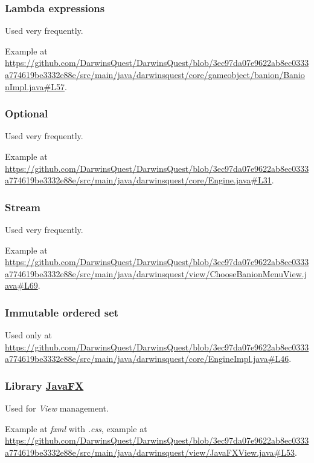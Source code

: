 \documentclass[12pt, a4paper]{report}
\theoremstyle{definition}
\begin{document}
        \subsubsection{Lambda expressions}

        Used very frequently.

        Example at \url{https://github.com/DarwinsQuest/DarwinsQuest/blob/3ec97da07e9622ab8ec0333a774619be3332e88e/src/main/java/darwinsquest/core/gameobject/banion/BanionImpl.java#L57}.

        \subsubsection{Optional}

        Used very frequently.

        Example at \url{https://github.com/DarwinsQuest/DarwinsQuest/blob/3ec97da07e9622ab8ec0333a774619be3332e88e/src/main/java/darwinsquest/core/Engine.java#L31}.

        \subsubsection{Stream}

        Used very frequently.

        Example at \url{https://github.com/DarwinsQuest/DarwinsQuest/blob/3ec97da07e9622ab8ec0333a774619be3332e88e/src/main/java/darwinsquest/view/ChooseBanionMenuView.java#L69}.

        \subsubsection{Immutable ordered set}

        Used only at \url{https://github.com/DarwinsQuest/DarwinsQuest/blob/3ec97da07e9622ab8ec0333a774619be3332e88e/src/main/java/darwinsquest/core/EngineImpl.java#L46}.

        \subsubsection{Library \href{https://openjfx.io/}{JavaFX}}
        
        Used for \emph{View} management.

        Example at \textit{fxml} with \textit{.css}, example at \url{https://github.com/DarwinsQuest/DarwinsQuest/blob/3ec97da07e9622ab8ec0333a774619be3332e88e/src/main/java/darwinsquest/view/JavaFXView.java#L53}.
        
\end{document}
